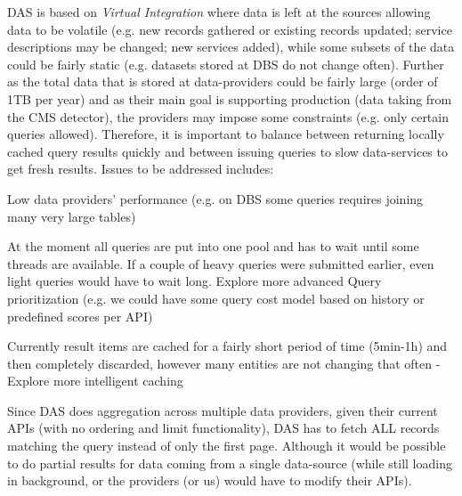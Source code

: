 DAS is based on \textit{Virtual Integration} where data is left at the sources allowing data to be volatile (e.g. new records gathered or existing records updated; service descriptions may be changed; new services added), while some subsets of the data could be fairly static (e.g. datasets stored at DBS do not change often). 
%
Further as the total data that is stored at data-providers could be fairly large (order of 1TB per year) and as their main goal is supporting production (data taking from the CMS detector), the providers may impose some constraints (e.g. only certain queries allowed).
%
Therefore, it is important to balance between returning locally cached query results quickly   and between issuing queries to slow data-services to get fresh results.
%
Issues to be addressed includes:
\begin{compactitem}
						\item Low data providers' performance (e.g. on DBS some queries requires joining many very large tables)
	     				\item At the moment all queries are put into one pool and has to wait until some threads are available. If a couple of heavy queries were submitted earlier, even light queries would have to wait long. Explore more advanced Query prioritization 
	     					(e.g. we could have some query cost model based on history or predefined scores per API)
	     					
                		\item Currently result items are cached for a fairly short period of time (5min-1h) and then completely discarded, however many entities are not changing that often - Explore more intelligent caching
	                	  
	                		

					\item Since DAS does aggregation across multiple data providers, given their current APIs (with no ordering and limit functionality), DAS has to fetch ALL records matching the query instead of only the first page. Although it would be possible to do partial results for data coming from a single data-source (while still loading in background, or the providers (or us) would have to modify their APIs).
					

\end{compactitem}
